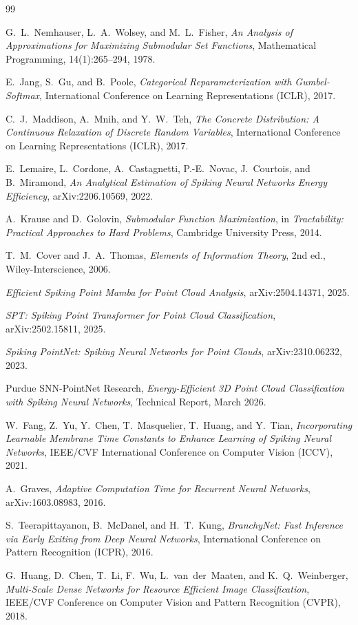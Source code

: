 \documentclass[11pt,a4paper]{article}
\begin{document}
\begin{thebibliography}{99}

G.~L.~Nemhauser, L.~A.~Wolsey, and M.~L.~Fisher,
\textit{An Analysis of Approximations for Maximizing Submodular Set Functions},
Mathematical Programming, 14(1):265--294, 1978.

E.~Jang, S.~Gu, and B.~Poole,
\textit{Categorical Reparameterization with Gumbel-Softmax},
International Conference on Learning Representations (ICLR), 2017.

C.~J.~Maddison, A.~Mnih, and Y.~W.~Teh,
\textit{The Concrete Distribution: A Continuous Relaxation of Discrete Random Variables},
International Conference on Learning Representations (ICLR), 2017.

E.~Lemaire, L.~Cordone, A.~Castagnetti, P.-E.~Novac, J.~Courtois, and B.~Miramond,
\textit{An Analytical Estimation of Spiking Neural Networks Energy Efficiency},
arXiv:2206.10569, 2022.

A.~Krause and D.~Golovin,
\textit{Submodular Function Maximization},
in \textit{Tractability: Practical Approaches to Hard Problems},
Cambridge University Press, 2014.

T.~M.~Cover and J.~A.~Thomas,
\textit{Elements of Information Theory}, 2nd ed.,
Wiley-Interscience, 2006.

\textit{Efficient Spiking Point Mamba for Point Cloud Analysis},
arXiv:2504.14371, 2025.

\textit{SPT: Spiking Point Transformer for Point Cloud Classification},
arXiv:2502.15811, 2025.

\textit{Spiking PointNet: Spiking Neural Networks for Point Clouds},
arXiv:2310.06232, 2023.

Purdue SNN-PointNet Research,
\textit{Energy-Efficient 3D Point Cloud Classification with Spiking Neural Networks},
Technical Report, March 2026.

W.~Fang, Z.~Yu, Y.~Chen, T.~Masquelier, T.~Huang, and Y.~Tian,
\textit{Incorporating Learnable Membrane Time Constants to Enhance Learning of Spiking Neural Networks},
IEEE/CVF International Conference on Computer Vision (ICCV), 2021.

A.~Graves,
\textit{Adaptive Computation Time for Recurrent Neural Networks},
arXiv:1603.08983, 2016.

S.~Teerapittayanon, B.~McDanel, and H.~T.~Kung,
\textit{BranchyNet: Fast Inference via Early Exiting from Deep Neural Networks},
International Conference on Pattern Recognition (ICPR), 2016.

G.~Huang, D.~Chen, T.~Li, F.~Wu, L.~van~der~Maaten, and K.~Q.~Weinberger,
\textit{Multi-Scale Dense Networks for Resource Efficient Image Classification},
IEEE/CVF Conference on Computer Vision and Pattern Recognition (CVPR), 2018.

\end{thebibliography}
\end{document}
